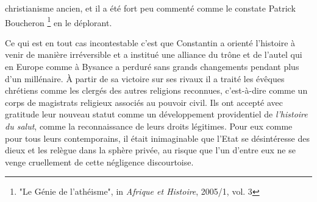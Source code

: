christianisme ancien, et il a été fort peu commenté comme le constate Patrick Boucheron \footnote{"Le Génie de l'athéisme", in \emph{Afrique et Histoire}, 2005/1, vol. 3} en le déplorant.

Ce qui est en tout cas incontestable c'est que Constantin a orienté l'histoire à venir de manière irréversible et a institué une alliance du trône et de l'autel qui en Europe comme à Bysance a perduré sans grands changements pendant plus d'un millénaire. À partir de sa victoire sur ses rivaux il a traité les évêques chrétiens comme les clergés des autres religions reconnues, c'est-à-dire comme un corps de magistrats religieux associés au pouvoir civil. Ils ont accepté avec gratitude leur nouveau statut comme un développement providentiel de \emph{l'histoire du salut}, comme la reconnaissance de leurs droits légitimes. Pour eux comme pour tous leurs contemporains, il était inimaginable que l'Etat se désintéresse des dieux et les relègue dans la sphère privée, au risque que l'un d'entre eux ne se venge cruellement de cette négligence discourtoise. 
 
